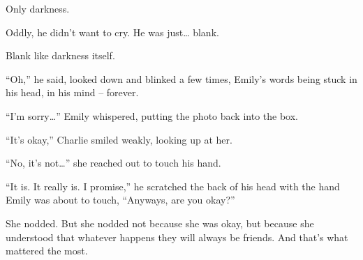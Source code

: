 Only darkness.

Oddly, he didn’t want to cry. He was just… blank.

Blank like darkness itself.

“Oh,” he said, looked down and blinked a few times, Emily’s words being stuck in his head, in his mind – forever.

“I’m sorry…” Emily whispered, putting the photo back into the box.

“It’s okay,” Charlie smiled weakly, looking up at her.

“No, it’s not…” she reached out to touch his hand.

“It is. It really is. I promise,” he scratched the back of his head with the hand Emily was about to touch, “Anyways, are you okay?”

She nodded. But she nodded not because she was okay, but because she understood that whatever happens they will always be friends. And that’s what mattered the most.